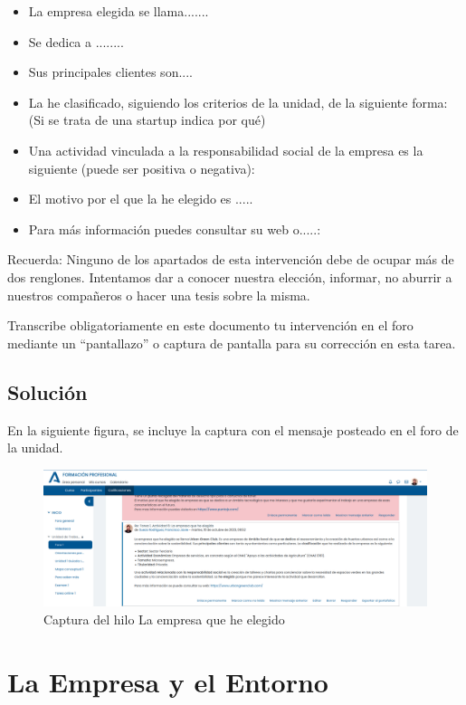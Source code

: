 \begin{itemize}
    \item La empresa elegida se llama.......
    \item Se dedica a ........
    \item Sus principales clientes son....
    \item La he clasificado, siguiendo los criterios de la unidad, de la siguiente forma:  (Si se trata de una startup indica por qué)
    \item Una actividad vinculada a la responsabilidad social de la empresa es la siguiente (puede ser positiva o negativa):
    \item El motivo por el que la he elegido es .....
    \item Para más información puedes consultar su web o.....:
\end{itemize}

Recuerda: Ninguno de los apartados de esta intervención debe de ocupar más de dos renglones. Intentamos dar a conocer nuestra elección, informar, no aburrir a nuestros compañeros o hacer una tesis sobre la misma.

Transcribe obligatoriamente en este documento tu intervención en el foro mediante un “pantallazo” o captura de pantalla para su corrección en esta tarea.

\subsection{Solución}
En la siguiente figura, se incluye la captura con el mensaje posteado en el foro de la unidad.

\begin{figure}[H]
    \centering
    \includegraphics[scale=0.30]{captura-foro.png}
    \caption{Captura del hilo La empresa que he elegido}
\end{figure}

\section{La Empresa y el Entorno}

